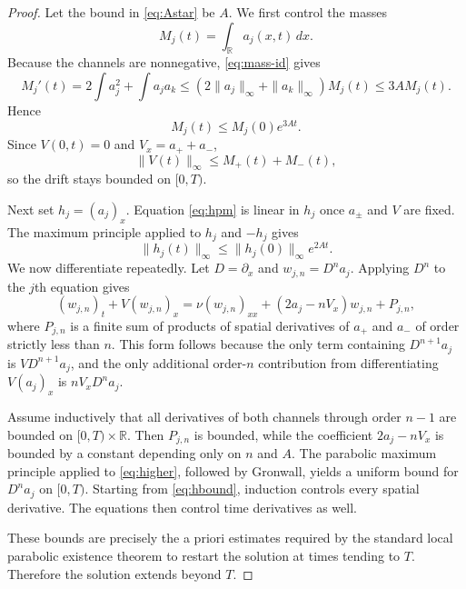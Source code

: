 \documentclass[10pt,a4paper]{amsart}
\newcommand{\R}{\mathbb R}
\begin{document}
\begin{proof}
Let the bound in \eqref{eq:Astar} be $A$.  We first control the masses
\[
 M_j(t)=\int_\R a_j(x,t)\,dx.
\]
Because the channels are nonnegative, \eqref{eq:mass-id} gives
\[
 M_j'(t)
 =2\int a_j^2+\int a_ja_k
 \le (2\|a_j\|_\infty+\|a_k\|_\infty)M_j(t)
 \le 3A M_j(t).
\]
Hence
\begin{equation}\label{eq:massbound}
 M_j(t)\le M_j(0)e^{3At}.
\end{equation}
Since $V(0,t)=0$ and $V_x=a_++a_-$,
\begin{equation}\label{eq:Vbound}
 \|V(t)\|_\infty
 \le M_+(t)+M_-(t),
\end{equation}
so the drift stays bounded on $[0,T)$.

Next set $h_j=(a_j)_x$.  Equation \eqref{eq:hpm} is linear in $h_j$ once $a_\pm$ and $V$ are fixed.  The maximum principle applied to $h_j$ and $-h_j$ gives
\begin{equation}\label{eq:hbound}
 \|h_j(t)\|_\infty
 \le \|h_j(0)\|_\infty e^{2At}.
\end{equation}
We now differentiate repeatedly.  Let $D=\partial_x$ and $w_{j,n}=D^na_j$.  Applying $D^n$ to the $j$th equation gives
\begin{equation}\label{eq:higher}
 (w_{j,n})_t+V(w_{j,n})_x
 =\nu(w_{j,n})_{xx}
 +(2a_j-nV_x)w_{j,n}+P_{j,n},
\end{equation}
where $P_{j,n}$ is a finite sum of products of spatial derivatives of $a_+$ and $a_-$ of order strictly less than $n$.  This form follows because the only term containing $D^{n+1}a_j$ is $V D^{n+1}a_j$, and the only additional order-$n$ contribution from differentiating $V(a_j)_x$ is $nV_xD^na_j$.

Assume inductively that all derivatives of both channels through order $n-1$ are bounded on $[0,T)\times\R$.  Then $P_{j,n}$ is bounded, while the coefficient $2a_j-nV_x$ is bounded by a constant depending only on $n$ and $A$.  The parabolic maximum principle applied to \eqref{eq:higher}, followed by Gronwall, yields a uniform bound for $D^na_j$ on $[0,T)$.  Starting from \eqref{eq:hbound}, induction controls every spatial derivative.  The equations then control time derivatives as well.

These bounds are precisely the a priori estimates required by the standard local parabolic existence theorem to restart the solution at times tending to $T$.  Therefore the solution extends beyond $T$.
\end{proof}
\end{document}
